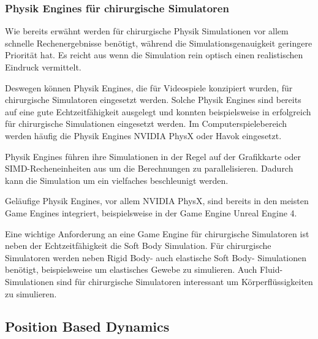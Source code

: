 \subsubsection{Physik Engines für chirurgische Simulatoren}

Wie bereits erwähnt werden für chirurgische Physik Simulationen vor allem schnelle Rechenergebnisse benötigt, während die Simulationsgenauigkeit geringere Priorität hat. Es reicht aus wenn die Simulation rein optisch einen realistischen Eindruck vermittelt.


Deswegen können Physik Engines, die für Videospiele konzipiert wurden, für chirurgische Simulatoren eingesetzt werden. Solche Physik Engines sind bereits auf eine gute Echtzeitfähigkeit ausgelegt und konnten beispielsweise in \cite{SimUpdate} erfolgreich für chirurgische Simulationen eingesetzt werden. 
Im Computerspielebereich werden häufig die Physik Engines NVIDIA PhysX oder Havok eingesetzt. 

Physik Engines führen ihre Simulationen in der Regel auf der Grafikkarte oder SIMD-Recheneinheiten aus um die Berechnungen zu parallelisieren. Dadurch kann die Simulation um ein vielfaches beschleunigt werden.

Geläufige Physik Engines, vor allem NVIDIA PhysX, sind bereits in den meisten Game Engines integriert, beispielsweise in der Game Engine Unreal Engine 4. 

Eine wichtige Anforderung an eine Game Engine für chirurgische Simulatoren ist neben der Echtzeitfähigkeit die Soft Body Simulation. Für chirurgische Simulatoren werden neben Rigid Body- auch elastische Soft Body- Simulationen benötigt, beispielsweise um elastisches Gewebe zu simulieren. Auch Fluid-Simulationen sind für chirurgische Simulatoren interessant um Körperflüssigkeiten zu simulieren.

\subsection{Position Based Dynamics}
\label{section_PBD}

